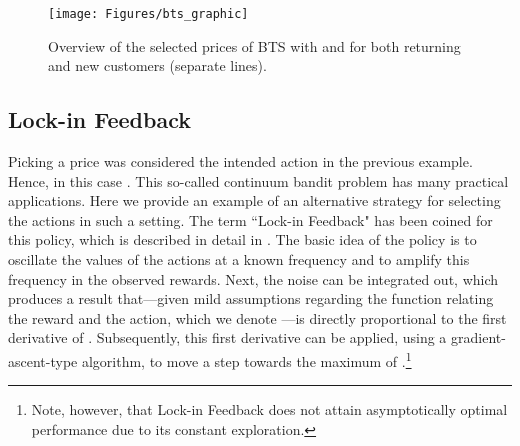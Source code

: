 \documentclass[nojss]{jss}
\begin{document}
\begin{figure}[h!]
  \centering
    \texttt{[image: Figures/bts\_graphic]}
      \caption{Overview of the selected prices of BTS with  and  for both returning and new customers (separate lines).}
      \label{fig:bts}
\end{figure}

\subsection{Lock-in Feedback}
\label{sec:lif}

Picking a price was considered the intended action in the previous example. Hence, in this case . This so-called continuum bandit problem \citep{Bubeck2011b} has many practical applications. Here we provide an example of an alternative strategy for selecting the actions in such a setting. The term ``Lock-in Feedback" has been coined for this policy, which is described in detail in \citet{Kaptein2014d}. The basic idea of the policy is to oscillate the values of the actions at a known frequency and to amplify this frequency in the observed rewards. Next, the noise can be integrated out, which produces a result that---given mild assumptions regarding the function relating the reward and the action, which we denote ---is directly proportional to the first derivative of . Subsequently, this first derivative can be applied, using a gradient-ascent-type algorithm, to move a step towards the maximum of .\footnote{Note, however, that Lock-in Feedback  does not attain asymptotically optimal performance due to its constant exploration.}
\end{document}
